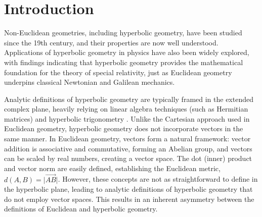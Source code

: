 \documentclass[a4paper]{article}
\theoremstyle{definition}
\begin{document}
\begin{abstract}
  In this paper, we present an Isabelle/HOL formalization of
  non-commu\-ta\-ti\-ve and non-associative algebraic structures known
  as \emph{gyrogroups} and \emph{gyrovector spaces}. These concepts
  were introduced by Abraham A. Ungar and have deep connections to
  hyperbolic geometry and special relativity. Gyrovector spaces can be
  used to define models of hyperbolic geometry. Unlike other models,
  gyrovector spaces offer the advantage that all definitions exhibit
  remarkable syntactical similarities to standard Euclidean and
  Cartesian geometry (e.g., points on the line between $a$ and $b$
  satisfy the parametric equation
  $a \oplus t\otimes(\ominus a \oplus b)$, for $t \in \mathbb{R}$,
  while the hyperbolic Pythagorean theorem is expressed as
  $a^2\oplus b^2 = c^2$, where $\otimes$, $\oplus$, and $\ominus$
  represent gyro operations).

  We begin by formally defining gyrogroups and gyrovector spaces and
  proving their numerous properties. Next, we formalize M\"obius and
  Einstein models of these abstract structures, and then demonstrate
  that these are equivalent to the Poincar\'e and Klein-Beltrami
  models, satisfying Tarski's geometry axioms for hyperbolic geometry.
  
\end{abstract}

\section{Introduction}

Non-Euclidean geometries, including hyperbolic geometry, have been
studied since the 19th century, and their properties are now well
understood. Applications of hyperbolic geometry in physics have also
been widely explored, with findings indicating that hyperbolic
geometry provides the mathematical foundation for the theory of
special relativity, just as Euclidean geometry underpins classical
Newtonian and Galilean mechanics.

Analytic definitions of hyperbolic geometry are typically framed in
the extended complex plane, heavily relying on linear algebra
techniques (such as Hermitian matrices) and hyperbolic trigonometry
\cite{schwerdtfeger}. Unlike the Cartesian approach used in
Euclidean geometry, hyperbolic geometry does not incorporate vectors
in the same manner. In Euclidean geometry, vectors form a natural
framework: vector addition is associative and commutative, forming an
Abelian group, and vectors can be scaled by real numbers, creating a
vector space. The dot (inner) product and vector norm are easily
defined, establishing the Euclidean metric,
$d(A, B) = \vert\overrightarrow{AB}\vert$. However, these concepts are
not as straightforward to define in the hyperbolic plane, leading to
analytic definitions of hyperbolic geometry that do not employ vector
spaces. This results in an inherent asymmetry between the definitions
of Euclidean and hyperbolic geometry.
\end{document}
